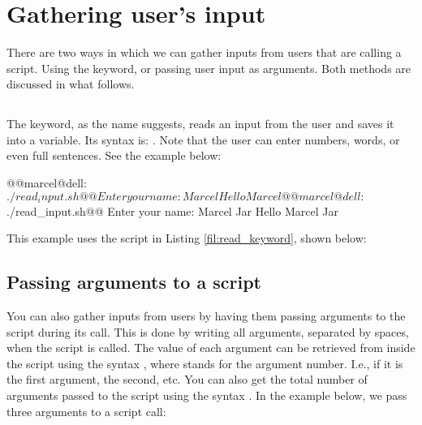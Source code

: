 
\section{Gathering user's input}

There are two ways in which we can gather inputs from users that are calling a script. Using the  keyword, or passing user input as arguments. Both methods are discussed in what follows.

\subsection{}

The  keyword, as the name suggests, reads an input from the user and saves it into a variable. Its syntax is: . Note that the user can enter numbers, words, or even full sentences. See the example below:

\begin{command_line}[Bash]
@@marcel@dell:~$./read_input.sh@@
Enter your name:
Marcel
Hello Marcel
@@marcel@dell:~$./read_input.sh@@
Enter your name:
Marcel Jar
Hello Marcel Jar
\end{command_line}
This example uses the script  in Listing \ref{fil:read_keyword}, shown below:

\subsection{Passing arguments to a script}

You can also gather inputs from users by having them passing arguments to the script during its call. This is done by writing all arguments, separated by spaces, when the script is called. The value of each argument can be retrieved from inside the script using the syntax , where  stands for the argument number. I.e., if it is the first argument, the second, etc. You can also get the total number of arguments passed to the script using the syntax \mycommand{\$\#}. In the example below, we pass three arguments to a script call:

